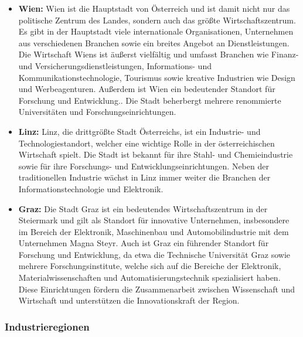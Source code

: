 \begin{itemize}
	\item \textbf{Wien:} Wien ist die Hauptstadt von Österreich und ist damit nicht nur das politische Zentrum des Landes, sondern auch das größte Wirtschaftszentrum. Es gibt in der Hauptstadt viele internationale Organisationen, Unternehmen aus verschiedenen Branchen sowie ein breites Angebot an Dienstleistungen. Die Wirtschaft Wiens ist äußerst vielfältig und umfasst Branchen wie Finanz- und Versicherungsdienstleistungen, Informations- und Kommunikationstechnologie, Tourismus sowie kreative Industrien wie Design und Werbeagenturen. Außerdem ist Wien ein bedeutender Standort für Forschung und Entwicklung.. Die Stadt beherbergt mehrere renommierte Universitäten und Forschungseinrichtungen.
	\item \textbf{Linz:} Linz, die drittgrößte Stadt Österreichs, ist ein Industrie- und Technologiestandort, welcher eine wichtige Rolle in der österreichischen Wirtschaft spielt. Die Stadt ist bekannt für ihre Stahl- und Chemieindustrie sowie für ihre Forschungs- und Entwicklungseinrichtungen. Neben der traditionellen Industrie wächst in Linz immer weiter die Branchen der Informationstechnologie und Elektronik.
	\item \textbf{Graz:} Die Stadt Graz ist ein bedeutendes Wirtschaftszentrum in der Steiermark und gilt als Standort für innovative Unternehmen, insbesondere im Bereich der Elektronik, Maschinenbau und Automobilindustrie mit dem Unternehmen Magna Steyr. Auch ist Graz ein führender Standort für Forschung und Entwicklung, da etwa die Technische Universität Graz sowie mehrere Forschungsinstitute, welche sich auf die Bereiche der Elektronik, Materialwissenschaften und Automatisierungstechnik spezialisiert haben. Diese Einrichtungen fördern die Zusammenarbeit zwischen Wissenschaft und Wirtschaft und unterstützen die Innovationskraft der Region.
\end{itemize}

\subsubsection{Industrieregionen}

